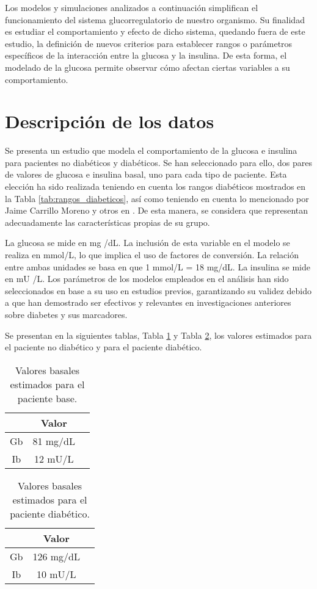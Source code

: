 
Los modelos y simulaciones analizados a continuación simplifican el funcionamiento del sistema glucorregulatorio de nuestro organismo. Su finalidad es estudiar el comportamiento y efecto de dicho sistema, quedando fuera de este estudio, la definición de nuevos criterios para establecer rangos o parámetros específicos de la interacción entre la glucosa y la insulina. De esta forma, el modelado de la glucosa permite observar cómo afectan ciertas variables a su comportamiento.

\section{Descripción de los datos}
Se presenta un estudio que modela el comportamiento de la glucosa e insulina para pacientes no diabéticos y diabéticos. Se han seleccionado para ello, dos pares de valores de glucosa e insulina basal, uno para cada tipo de paciente. Esta elección ha sido realizada teniendo en cuenta los rangos diabéticos mostrados en la Tabla  \ref{tab:rangos_diabeticos}, así como teniendo en cuenta lo mencionado por Jaime Carrillo Moreno y otros en \cite{carrillo2021long}. De esta manera, se considera que representan adecuadamente las características propias de su grupo.

La glucosa se mide en mg /dL. La inclusión de esta variable en el modelo se realiza en mmol/L, lo que implica el uso de factores de conversión. La relación entre ambas unidades se basa en que 1 mmol/L = 18 mg/dL.
La insulina se mide en mU /L.
Los parámetros de los modelos empleados en el análisis han sido seleccionados en base a su uso en estudios previos, garantizando su validez debido a que han demostrado ser efectivos y relevantes en investigaciones anteriores sobre diabetes y sus marcadores.

Se presentan en la siguientes tablas, Tabla \ref{tab:valores_no_diabetico} y Tabla \ref{tab:valores_diabetico}, los valores estimados para el paciente no diabético y para el paciente diabético.

\begin{table}[htbp]
    \centering
    \caption{Valores basales estimados para el paciente base.}
    \begin{tabular}{|c|c|c|}
        \hline
          & Valor\\
        \hline
        Gb & 81 mg/dL \\
        Ib & 12 mU/L  \\
        \hline
    \end{tabular}
    \label{tab:valores_no_diabetico}
\end{table}
\begin{table}[htbp]
    \centering
    \caption{Valores basales estimados para el paciente diabético.}
    \begin{tabular}{|c|c|c|}
        \hline
          & Valor\\
        \hline
        Gb & 126 mg/dL \\
        Ib & 10 mU/L  \\
        \hline
    \end{tabular}
    \label{tab:valores_diabetico}
\end{table}

